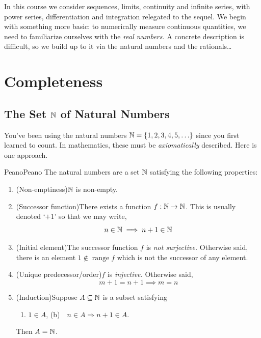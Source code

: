In this course we consider sequences, limits, continuity and infinite series, with power series, differentiation and integration relegated to the sequel. We begin with something more basic: to numerically measure continuous quantities, we need to familiarize ourselves with the \emph{real numbers.} A concrete description is difficult, so we build up to it via the natural numbers and the rationals\ldots


\goodbreak

\section{Completeness}\label{sec:complete}

\subsection[The Set N of Natural Numbers]{The Set $\mathbb{N}$ of Natural Numbers}\label{sec:natural}

You've been using the natural numbers $\mathbb{N}=\{1,2,3,4,5,\ldots\}$ since you first learned to count. In mathematics, these must be \emph{axiomatically} described. Here is one approach.

\begin{axioms}{Peano}{Peano}
	The natural numbers are a set $\mathbb{N}$ satisfying the following properties:
	\begin{enumerate}
	  \item (Non-emptiness)\lstsp $\mathbb{N}$ is non-empty.
		\item (Successor function)\lstsp There exists a function $f:\mathbb{N}\to\mathbb{N}$. This is usually denoted `$+1$' so that we may write,
		\[
			n\in\mathbb{N}\implies n+1\in\mathbb{N}
		\]
		\item (Initial element)\lstsp The successor function $f$ is \emph{not surjective.} Otherwise said, there is an element $1\not\in\operatorname{range}f$ which is not the successor of any element.\footnotemark
		\item (Unique predecessor/order)\lstsp $f$ is \emph{injective.} Otherwise said,
		\[
			m+1=n+1\implies m=n
		\]
		\item (Induction)\lstsp Suppose $A\subseteq\mathbb{N}$ is a subset satisfying
		\begin{enumerate}
		  \item $1\in A$,\qquad\qquad
		  (b)\ \ $n\in A\Longrightarrow n+1\in A$.
		\end{enumerate}
		Then $A=\mathbb{N}$.
	\end{enumerate}
\end{axioms}

